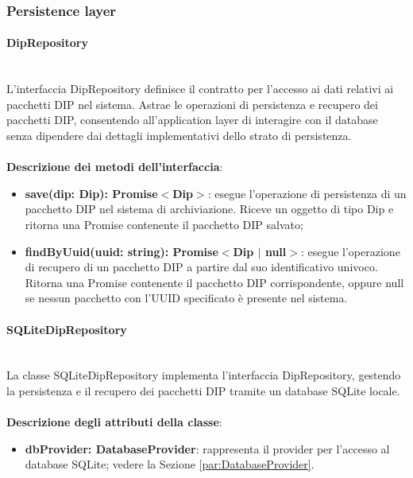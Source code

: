 \documentclass[a4paper,12pt]{article}
\begin{document}
{{            \subsubsection{Persistence layer} {
                \paragraph{DipRepository}\label{par:DipRepository}\mbox{}\\
                L'interfaccia DipRepository definisce il contratto per l'accesso ai dati relativi ai pacchetti DIP nel sistema. Astrae le operazioni di persistenza e recupero dei pacchetti DIP, consentendo all'application layer di interagire con il database senza dipendere dai dettagli implementativi dello strato di persistenza.\\
                \\
              \noindent \textbf{Descrizione dei metodi dell'interfaccia}:
                \begin{itemize}
                    \item \textbf{save(dip: Dip): Promise$<$Dip$>$}: esegue l'operazione di persistenza di un pacchetto DIP nel sistema di archiviazione. Riceve un oggetto di tipo Dip e ritorna una Promise contenente il pacchetto DIP salvato;
                    \item \textbf{findByUuid(uuid: string): Promise$<$Dip $|$ null$>$}: esegue l'operazione di recupero di un pacchetto DIP a partire dal suo identificativo univoco. Ritorna una Promise contenente il pacchetto DIP corrispondente, oppure null se nessun pacchetto con l'UUID specificato è presente nel sistema.
                \end{itemize}
                \paragraph{SQLiteDipRepository}\label{par:SQLiteDipRepository}\mbox{}\\
                La classe SQLiteDipRepository implementa l'interfaccia DipRepository, gestendo la persistenza e il recupero dei pacchetti DIP tramite un database SQLite locale.\\
                \\
                \textbf{Descrizione degli attributi della classe}:
                \begin{itemize}
                    \item \textbf{dbProvider: DatabaseProvider}: rappresenta il provider per l'accesso al database SQLite; vedere la Sezione \ref{par:DatabaseProvider}.
                \end{itemize}
 
}}}
\end{document}
